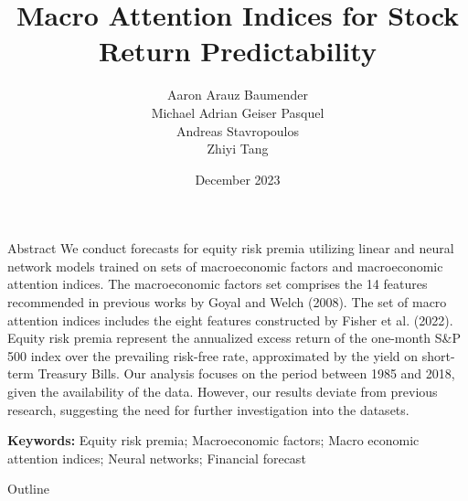 \documentclass{beamer}
\title[]{Macro Attention Indices for Stock Return Predictability}
\author[Arauz, Geiser, Stavropoulos, Tang]{Aaron Arauz Baumender  \\ Michael Adrian Geiser Pasquel \\ Andreas Stavropoulos \\ Zhiyi Tang}
\date{December 2023}
\begin{document}
\begin{frame}
  \titlepage
\end{frame}

\begin{frame}{Abstract}
  We conduct forecasts for equity risk premia utilizing linear and neural network models trained on sets of macroeconomic factors and macroeconomic attention indices. The macroeconomic factors set comprises the 14 features recommended in previous works by Goyal and Welch (2008). The set of macro attention indices includes the eight features constructed by Fisher et al. (2022). Equity risk premia represent the annualized excess return of the one-month S\&P 500 index over the prevailing risk-free rate, approximated by the yield on short-term Treasury Bills. Our analysis focuses on the period between 1985 and 2018, given the availability of the data. However, our results deviate from previous research, suggesting the need for further investigation into the datasets.
  \vspace{1em}

  \textbf{Keywords:} Equity risk premia; Macroeconomic factors; Macro economic attention indices; Neural networks; Financial forecast
\end{frame}

\begin{frame}{Outline}
  \tableofcontents
\end{frame}
\end{document}
